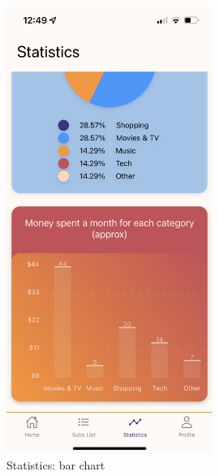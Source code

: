 \documentclass[12pt]{article}
\begin{document}
\begin{figure}[h!]
    \centering
    \begin{minipage}[c]{0.45\textwidth}
        \centering
        \includegraphics[width=0.6\textwidth, clip]{../../assets/smartphone/stat2.PNG}
        \caption{Statistics: bar chart}
        \label{fig:stat2}
    \end{minipage}\hspace{1cm}%
    \begin{minipage}[c]{0.45\textwidth}
        \centering

\end{minipage}
\end{figure}
\end{document}
